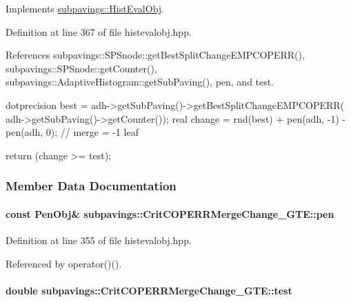 \-Implements \hyperlink{classsubpavings_1_1HistEvalObj_a56a8d23818446775d7e4ef24755425e9}{subpavings\-::\-Hist\-Eval\-Obj}.



\-Definition at line 367 of file histevalobj.\-hpp.



\-References subpavings\-::\-S\-P\-Snode\-::get\-Best\-Split\-Change\-E\-M\-P\-C\-O\-P\-E\-R\-R(), subpavings\-::\-S\-P\-Snode\-::get\-Counter(), subpavings\-::\-Adaptive\-Histogram\-::get\-Sub\-Paving(), pen, and test.


\begin{DoxyCode}
    {

        dotprecision best = adh->getSubPaving()->getBestSplitChangeEMPCOPERR(
                                adh->getSubPaving()->getCounter());
        real change = rnd(best) + pen(adh, -1) - pen(adh, 0); // merge = -1
       leaf

        return (change >= test);
    }
\end{DoxyCode}


\subsubsection{\-Member \-Data \-Documentation}
\hypertarget{classsubpavings_1_1CritCOPERRMergeChange__GTE_a33a7866852738c521e35e05e1eb7eb5a}{
\paragraph[{pen}]{\setlength{\rightskip}{0pt plus 5cm}const {\bf \-Pen\-Obj}\& {\bf subpavings\-::\-Crit\-C\-O\-P\-E\-R\-R\-Merge\-Change\-\_\-\-G\-T\-E\-::pen}}}\label{classsubpavings_1_1CritCOPERRMergeChange__GTE_a33a7866852738c521e35e05e1eb7eb5a}


\-Definition at line 355 of file histevalobj.\-hpp.



\-Referenced by operator()().

\hypertarget{classsubpavings_1_1CritCOPERRMergeChange__GTE_ac7f461e466592ee2b94c701bf6969f84}{
\paragraph[{test}]{\setlength{\rightskip}{0pt plus 5cm}double {\bf subpavings\-::\-Crit\-C\-O\-P\-E\-R\-R\-Merge\-Change\-\_\-\-G\-T\-E\-::test}}}\label{classsubpavings_1_1CritCOPERRMergeChange__GTE_ac7f461e466592ee2b94c701bf6969f84}


